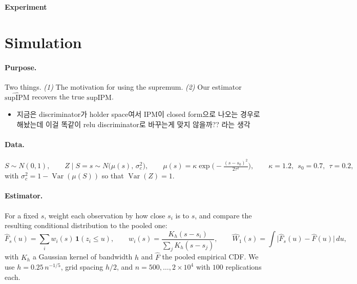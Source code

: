 \documentclass[10pt]{article}
\newtheorem{proposition}{Proposition}
\newcommand{\supIPM}{\mathrm{supIPM}}
\newcommand{\hsupIPM}{\widehat{\supIPM}}
\newcommand{\Wone}{W_1}
\begin{document}
\begin{center}\vspace{-0.5em}
{\large\bfseries Experiment}
\vspace{-0.5em}\end{center}


\section{Simulation}

\paragraph{Purpose.} Two things. \emph{(1)} The motivation for using the supremum. \emph{(2)} Our estimator $\hsupIPM$ recovers the true
$\supIPM$.

\begin{itemize}
    \item 지금은 discriminator가 holder space여서 IPM이 closed form으로 나오는 경우로 해놨는데 이걸 똑같이 relu discriminator로 바꾸는게 맞지 않을까?? 라는 생각
\end{itemize}




\paragraph{Data.}
\[
S \sim N(0,1), \qquad Z \mid S{=}s \sim N\!\big(\mu(s),\,\sigma_c^2\big),
\qquad \mu(s) = \kappa\exp\!\Big(\!-\tfrac{(s-s_0)^2}{2\tau^2}\Big),
\qquad \kappa = 1.2,\ \ s_0 = 0.7,\ \ \tau = 0.2,
\]
with $\sigma_c^2 = 1 - \operatorname{Var}(\mu(S))$ so that $\operatorname{Var}(Z) = 1$. 

\paragraph{Estimator.} For a fixed $s$, weight each observation by how close $s_i$ is to $s$, and
compare the resulting conditional distribution to the pooled one:
\[
\widehat F_s(u) = \sum_i w_i(s)\,\mathbf 1(z_i \le u), \qquad
w_i(s) = \frac{K_h(s-s_i)}{\sum_j K_h(s-s_j)}, \qquad
\widehat \Wone(s) = \int \big|\widehat F_s(u) - \widehat F(u)\big|\,du ,
\]
with $K_h$ a Gaussian kernel of bandwidth $h$ and $\widehat F$ the pooled empirical CDF. 
We use $h = 0.25\,n^{-1/5}$, grid spacing $h/2$, and $n = 500,\dots,2{\times}10^4$ with $100$
replications each.
\end{document}
